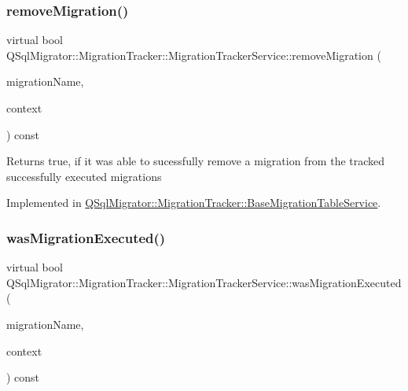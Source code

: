 \subsubsection{\texorpdfstring{remove\+Migration()}{removeMigration()}}
{\footnotesize\ttfamily virtual bool Q\+Sql\+Migrator\+::\+Migration\+Tracker\+::\+Migration\+Tracker\+Service\+::remove\+Migration (\begin{DoxyParamCaption}\item[{const Q\+String \&}]{migration\+Name,  }\item[{const \hyperlink{class_q_sql_migrator_1_1_command_execution_1_1_command_execution_context}{Command\+Execution\+::\+Command\+Execution\+Context} \&}]{context }\end{DoxyParamCaption}) const\hspace{0.3cm}{\ttfamily [pure virtual]}}

\begin{DoxyReturn}{Returns}
true, if it was able to sucessfully remove a migration from the tracked successfully executed migrations 
\end{DoxyReturn}


Implemented in \hyperlink{class_q_sql_migrator_1_1_migration_tracker_1_1_base_migration_table_service_a2b0bf914a7672e5540b7b003cd378aaf}{Q\+Sql\+Migrator\+::\+Migration\+Tracker\+::\+Base\+Migration\+Table\+Service}.

\mbox{\label{class_q_sql_migrator_1_1_migration_tracker_1_1_migration_tracker_service_a8bb56a82aeefab574a0d7eb2dd5112e5}} 
\subsubsection{\texorpdfstring{was\+Migration\+Executed()}{wasMigrationExecuted()}}
{\footnotesize\ttfamily virtual bool Q\+Sql\+Migrator\+::\+Migration\+Tracker\+::\+Migration\+Tracker\+Service\+::was\+Migration\+Executed (\begin{DoxyParamCaption}\item[{const Q\+String \&}]{migration\+Name,  }\item[{const \hyperlink{class_q_sql_migrator_1_1_command_execution_1_1_command_execution_context}{Command\+Execution\+::\+Command\+Execution\+Context} \&}]{context }\end{DoxyParamCaption}) const\hspace{0.3cm}{\ttfamily [pure virtual]}}

